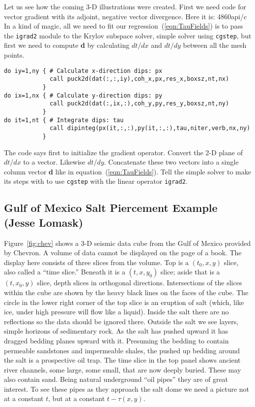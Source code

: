 Let us see how the coming 3-D illustrations were created.
First we need code for vector gradient with its adjoint,
negative vector divergence. Here it is: 
 {48}{60}{api/c}
In a kind of magic, all we need to fit our regression~(\ref{eqn:TauFields})
is to pass the {\tt igrad2} 
module to the Krylov subspace solver,
simple solver using {\tt cgstep},
but first we need 
to compute {\bf d} by calculating $dt/dx$ and $dt/dy$ between
all the mesh points. 
\begin{verbatim}
do iy=1,ny { # Calculate x-direction dips: px 
             call puck2d(dat(:,:,iy),coh_x,px,res_x,boxsz,nt,nx) 
           } 
do ix=1,nx { # Calculate y-direction dips: py 
             call puck2d(dat(:,ix,:),coh_y,py,res_y,boxsz,nt,ny) 
           } 
do it=1,nt { # Integrate dips: tau 
             call dipinteg(px(it,:,:),py(it,:,:),tau,niter,verb,nx,ny) 
           } 
\end{verbatim}
The code says first to initialize the gradient operator.
Convert the 2-D plane of $dt/dx$ to a vector.
Likewise $dt/dy$.
Concatenate these two vectors
into a single column vector {\bf d} like in
equation~(\ref{eqn:TauFields}).
Tell the simple solver to make its steps
with to use {\tt cgstep} with the linear operator {\tt igrad2}. 

\subsection{Gulf of Mexico Salt Piercement Example (Jesse Lomask) }
Figure~\ref{fig:chev} shows a 3-D seismic data cube from the Gulf of Mexico provided by 
Chevron. A volume of data cannot be displayed on the page of a book. The display 
here consists of three slices from the volume. Top is a $(t_0 , x , y )$ slice, also called a 
``time slice.'' Beneath it is a $(t , x , y_0 )$ slice; aside that is a $(t , x_0 , y )$ slice, depth slices 
in orthogonal directions. Intersections of the slices within the cube are shown by 
the heavy black lines on the faces of the cube. The circle in the lower right corner 
of the top slice is an eruption of salt (which, like ice, under high pressure will flow 
like a liquid). Inside the salt there are no reflections so the data should be ignored 
there. Outside the salt we see layers, simple horizons of sedimentary rock. As the 
salt has pushed upward it has dragged bedding planes upward with it.
Presuming the bedding to contain permeable sandstones and impermeable shales,
the pushed up bedding around the salt is a prospective oil trap.
The time slice in the top panel shows ancient river channels,
some large, some small, that are now deeply buried. 
These may also contain sand.
Being natural underground ``oil pipes'' they are of great interest.
To see these pipes as they approach the salt dome
we need a picture not at a constant $t$,
but at a constant $t -\tau (x , y )$. 

